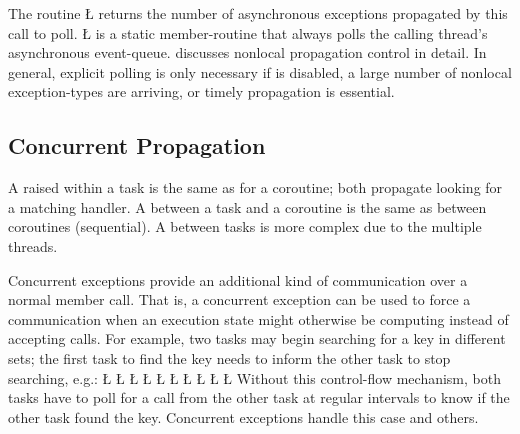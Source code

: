 \documentclass[openright,twoside]{report}
\begin{document}
%
The routine \LGinlinetrue\LGbegin\lgrinde\L{}\endlgrinde\LGend{} returns the number of asynchronous exceptions propagated by this call to poll.
\LGinlinetrue\LGbegin\lgrinde\L{}\endlgrinde\LGend{} is a static member-routine that always polls the calling thread's asynchronous event-queue.
 discusses nonlocal propagation control in detail.
In general, explicit polling is only necessary if  is disabled, a large number of nonlocal exception-types are arriving, or timely propagation is essential.


\subsection{Concurrent Propagation}
\label{s:ConcurrentPropagation}

A  raised within a task is the same as for a coroutine;
both propagate looking for a matching handler.
A  between a task and a coroutine is the same as between coroutines (sequential).
A  between tasks is more complex due to the multiple threads.

Concurrent exceptions provide an additional kind of communication over a normal member call.
That is, a concurrent exception can be used to force a communication when an execution state might otherwise be computing instead of accepting calls.
For example, two tasks may begin searching for a key in different sets;
the first task to find the key needs to inform the other task to stop searching, e.g.:
\LGinlinefalse\LGbegin\lgrinde
\L{}
\L{\LB{}}
\CE{}\L{\LB{}}
\L{\LB{}}
\L{\LB{}}
\L{\LB{}}
\CE{}\L{\LB{}}
\L{\LB{}}
\CE{}\L{\LB{}}
\L{\LB{}}
\endlgrinde\LGend
Without this control-flow mechanism, both tasks have to poll for a call from the other task at regular intervals to know if the other task found the key.
Concurrent exceptions handle this case and others.
\end{document}
